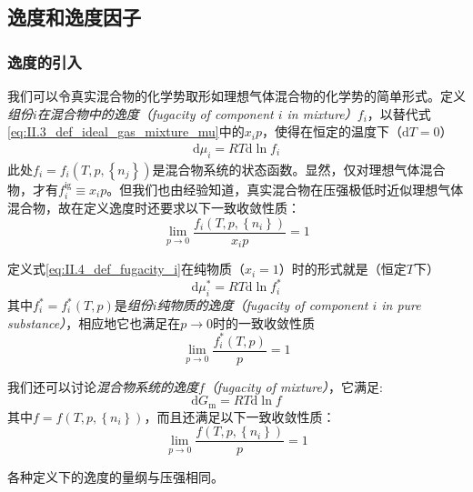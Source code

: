 \documentclass[main.tex]{subfiles}
\begin{document}
\subsection{逸度和逸度因子}
\subsubsection{逸度的引入}
我们可以令真实混合物的化学势取形如理想气体混合物的化学势的简单形式。定义\emph{组份$i$在混合物中的逸度（fugacity of component $i$ in mixture）}$f_i$，以替代式\eqref{eq:II.3_def_ideal_gas_mixture_mu}中的$x_ip$，使得在恒定的温度下（$\mathrm{d}T=0$）
\begin{align}\label{eq:II.4_def_fugacity_i}
  \mathrm{d}\mu_i=RT\mathrm{d}\ln f_i
\end{align}
此处$f_i=f_i\left(T,p,\left\{n_j\right\}\right)$是混合物系统的状态函数。显然，仅对理想气体混合物，才有$f_i^\text{ig}\equiv x_i p$。但我们也由经验知道，真实混合物在压强极低时近似理想气体混合物，故在定义逸度时还要求以下一致收敛性质：
\[\lim_{p\to 0}\frac{f_i\left(T,p,\left\{n_i\right\}\right)}{x_i p}=1\]

定义式\eqref{eq:II.4_def_fugacity_i}在纯物质（$x_i=1$）时的形式就是（恒定$T$下）
\begin{equation}\label{eq:II.4_def_fugacity_i*}
  \mathrm{d}\mu_i^*=RT\mathrm{d}\ln f_i^*
\end{equation}
其中$f_i^*=f_i^*\left(T,p\right)$是\emph{组份$i$纯物质的逸度（fugacity of component $i$ in pure substance）}，相应地它也满足在$p\rightarrow 0$时的一致收敛性质
\[\lim_{p\to 0}\frac{f_i^*\left(T,p\right)}{p}=1\]

我们还可以讨论\emph{混合物系统的逸度$f$（fugacity of mixture）}，它满足:
\begin{equation}\label{eq:II.4_def_fugacity_f}
  \mathrm{d}G_\text{m}=RT\mathrm{d}\ln f
\end{equation}
其中$f=f\left(T,p,\left\{n_i\right\}\right)$，而且还满足以下一致收敛性质：
\[\lim_{p\to 0}\frac{f\left(T,p,\left\{n_i\right\}\right)}{p}=1\]

各种定义下的逸度的量纲与压强相同。
\end{document}
